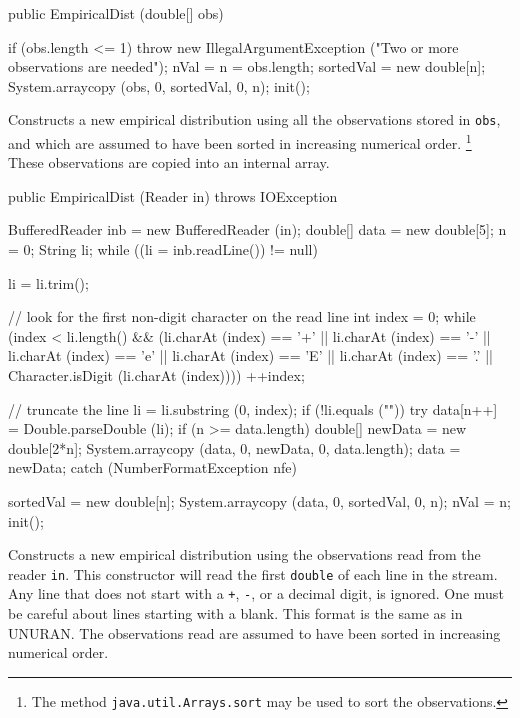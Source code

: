 \begin{code}

   public EmpiricalDist (double[] obs)\begin{hide} {
      if (obs.length <= 1)
         throw new IllegalArgumentException
            ("Two or more observations are needed");
      nVal = n = obs.length;
      sortedVal = new double[n];
      System.arraycopy (obs, 0, sortedVal, 0, n);
      init();
   }\end{hide}
\end{code}
\begin{tabb}
  Constructs a new empirical distribution using
  all the observations stored in \texttt{obs}, and which are  assumed
  to have been sorted in increasing numerical order. \footnote{The method
  \texttt{java.util.Arrays.sort} may be used to sort the observations.}
  These observations are copied into an internal array.
\end{tabb}
\begin{code}

   public EmpiricalDist (Reader in) throws IOException\begin{hide} {
      BufferedReader inb = new BufferedReader (in);
      double[] data = new double[5];
      n = 0;
      String li;
      while ((li = inb.readLine()) != null) {
        li = li.trim();

         // look for the first non-digit character on the read line
         int index = 0;
         while (index < li.length() &&
            (li.charAt (index) == '+' || li.charAt (index) == '-' ||
             li.charAt (index) == 'e' || li.charAt (index) == 'E' ||
             li.charAt (index) == '.' || Character.isDigit (li.charAt (index))))
           ++index;

         // truncate the line
         li = li.substring (0, index);
         if (!li.equals ("")) {
            try {
               data[n++] = Double.parseDouble (li);
               if (n >= data.length) {
                  double[] newData = new double[2*n];
                  System.arraycopy (data, 0, newData, 0, data.length);
                  data = newData;
               }
            }
            catch (NumberFormatException nfe) {}
         }
      }
      sortedVal = new double[n];
      System.arraycopy (data, 0, sortedVal, 0, n);
      nVal = n;
      init();
   }\end{hide}
\end{code}
\begin{tabb}   Constructs a new empirical distribution using
  the observations read from the reader \texttt{in}. This constructor
  will read the first \texttt{double} of each line in the stream.
  Any line that does not start with a \texttt{+}, \texttt{-}, or a decimal digit,
  is ignored.  One must be careful about lines starting with a blank.
  This format is the same as in UNURAN. The observations read are  assumed
  to have been sorted in increasing numerical order.
\end{tabb}

